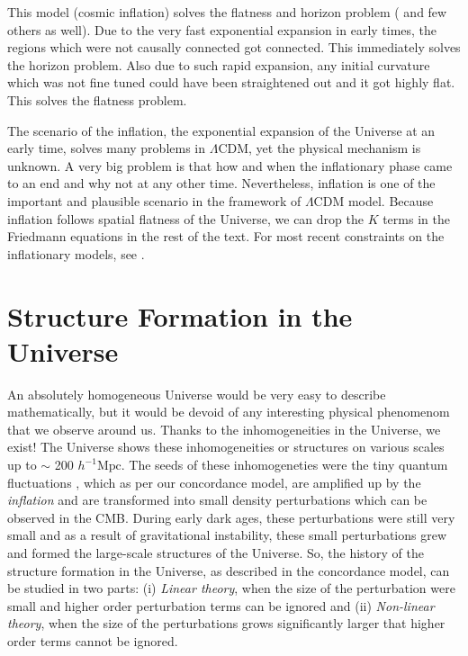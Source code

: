 This model (cosmic inflation) solves the flatness and horizon problem (
and few others as well). Due to the very fast exponential expansion in early times, the
regions which were not causally connected got connected. This immediately solves
the horizon problem. Also due to such rapid expansion, any initial curvature which
was not fine tuned could have been straightened out and it got highly flat. This solves the
flatness problem. 

The scenario of the inflation, the exponential expansion of the Universe at 
an early time, solves many problems in $\Lambda$CDM, yet the physical mechanism
is unknown. A very big problem is that how and when the inflationary phase came
to an end and why not at any other time. Nevertheless, inflation is one of the
important and plausible scenario in the framework of $\Lambda$CDM model. Because
inflation follows spatial flatness  of the Universe, 
we can drop the $K$ terms in the Friedmann
equations in the rest of the text. For most recent constraints on 
the inflationary models, see \cite{2015arXiv150202114P}.

\section{Structure Formation in the Universe}

An absolutely homogeneous Universe would be very easy to describe mathematically, but it would be devoid of any interesting physical phenomenom that we observe around us. Thanks to the inhomogeneities in the Universe, we exist! The Universe
shows these inhomogeneities or structures on various scales up to $\sim$ 
200 $h^{-1} \mathrm{Mpc}$. The seeds
of these inhomogeneties were the tiny quantum fluctuations \citep{1939Phy.....6..899S}
, which as per our concordance 
model, are amplified up by the {\it inflation} and are transformed into small density
perturbations which can be observed in the CMB. 
During early dark ages, these perturbations were still very small and as 
a result of gravitational instability, these small perturbations 
grew and formed the large-scale structures of the Universe. 
So, the history of the  structure formation in the Universe, as described in the 
concordance model, can be studied in two parts: (i) {\it Linear theory}, when
the size of the perturbation were small and higher order perturbation terms can be ignored and 
(ii) {\it Non-linear theory}, when the size of the perturbations grows significantly
larger that higher order terms cannot be ignored.

